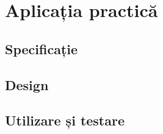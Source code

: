 \chapter{Aplicația practică}
\label{chap:ch6}

\section{Specificație}
\label{chap:ch6sec1}

\section{Design}
\label{chap:ch6sec2}

\section{Utilizare și testare}
\label{chap:ch6sec3}

